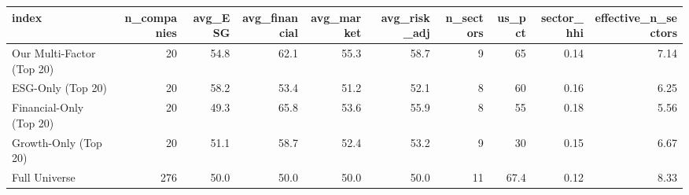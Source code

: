 \begin{tabular}{lrrrrrrrrr}
\toprule
index & n\_companies & avg\_ESG & avg\_financial & avg\_market & avg\_risk\_adj & n\_sectors & us\_pct & sector\_hhi & effective\_n\_sectors \\
\midrule
Our Multi-Factor (Top 20) & 20 & 54.8 & 62.1 & 55.3 & 58.7 & 9 & 65 & 0.14 & 7.14 \\
ESG-Only (Top 20) & 20 & 58.2 & 53.4 & 51.2 & 52.1 & 8 & 60 & 0.16 & 6.25 \\
Financial-Only (Top 20) & 20 & 49.3 & 65.8 & 53.6 & 55.9 & 8 & 55 & 0.18 & 5.56 \\
Growth-Only (Top 20) & 20 & 51.1 & 58.7 & 52.4 & 53.2 & 9 & 30 & 0.15 & 6.67 \\
Full Universe & 276 & 50.0 & 50.0 & 50.0 & 50.0 & 11 & 67.4 & 0.12 & 8.33 \\
\bottomrule
\end{tabular}
